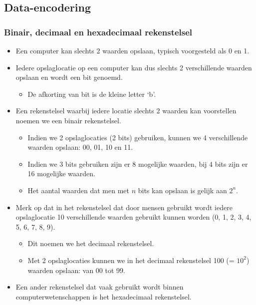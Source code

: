 \documentclass[]{tufte-book}
\providecommand{\tightlist}{%
  \setlength{\itemsep}{0pt}\setlength{\parskip}{0pt}}
\begin{document}
\hypertarget{data-encodering}{%
\subsection{Data-encodering}\label{data-encodering}}

\hypertarget{binair-decimaal-en-hexadecimaal-rekenstelsel}{%
\subsubsection{Binair, decimaal en hexadecimaal rekenstelsel}\label{binair-decimaal-en-hexadecimaal-rekenstelsel}}

\begin{itemize}
\tightlist
\item
  Een computer kan slechts 2 waarden opslaan, typisch voorgesteld als 0 en 1.
\item
  Iedere opslaglocatie op een computer kan dus slechts 2 verschillende waarden opslaan en wordt een bit genoemd.

  \begin{itemize}
  \tightlist
  \item
    De afkorting van bit is de kleine letter `b'.
  \end{itemize}
\item
  Een rekenstelsel waarbij iedere locatie slechts 2 waarden kan voorstellen noemen we een binair rekenstelsel.

  \begin{itemize}
  \tightlist
  \item
    Indien we 2 opslaglocaties (2 bits) gebruiken, kunnen we 4 verschillende waarden opslaan: 00, 01, 10 en 11.
  \item
    Indien we 3 bits gebruiken zijn er 8 mogelijke waarden, bij 4 bits zijn er 16 mogelijke waarden.
  \item
    Het aantal waarden dat men met \(n\) bits kan opslaan is gelijk aan \(2^n\).
  \end{itemize}
\item
  Merk op dat in het rekenstelsel dat door mensen gebruikt wordt iedere opslaglocatie 10 verschillende waarden gebruikt kunnen worden (0, 1, 2, 3, 4, 5, 6, 7, 8, 9).

  \begin{itemize}
  \tightlist
  \item
    Dit noemen we het decimaal rekenstelsel.
  \item
    Met 2 opslaglocaties kunnen we in het decimaal rekenstelsel 100 (= \(10^2\)) waarden opslaan: van 00 tot 99.
  \end{itemize}
\item
  Een ander rekenstelsel dat vaak gebruikt wordt binnen computerwetenschappen is het hexadecimaal rekenstelsel.


\end{itemize}
\end{document}
